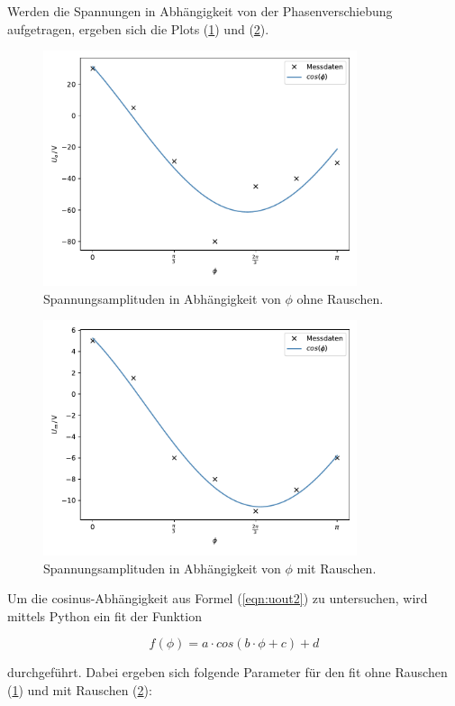 \newpage

\noindent
Werden die Spannungen in Abhängigkeit von der Phasenverschiebung aufgetragen, ergeben sich die Plots (\ref{fig:phase}) und (\ref{fig:phasenoise}).

\begin{figure}
  \centering
  \includegraphics[height=6.9cm]{Daten/phase.pdf}
  \caption{Spannungsamplituden in Abhängigkeit von $\phi$ ohne Rauschen.}
  \label{fig:phase}
\end{figure}

\begin{figure}
  \centering
  \includegraphics[height=6.9cm]{Daten/phasenoise.pdf}
  \caption{Spannungsamplituden in Abhängigkeit von $\phi$ mit Rauschen.}
  \label{fig:phasenoise}
\end{figure}

\newpage
\noindent
Um die cosinus-Abhängigkeit aus Formel (\ref{eqn:uout2}) zu untersuchen, wird mittels Python ein fit der Funktion 

\begin{equation*}
f(\phi) = a \cdot cos(b \cdot \phi + c) + d
\label{eqn:cos}
\end{equation*}

\noindent
durchgeführt.
Dabei ergeben sich folgende Parameter für den fit ohne Rauschen (\ref{fig:phase}) und mit Rauschen (\ref{fig:phasenoise}):


